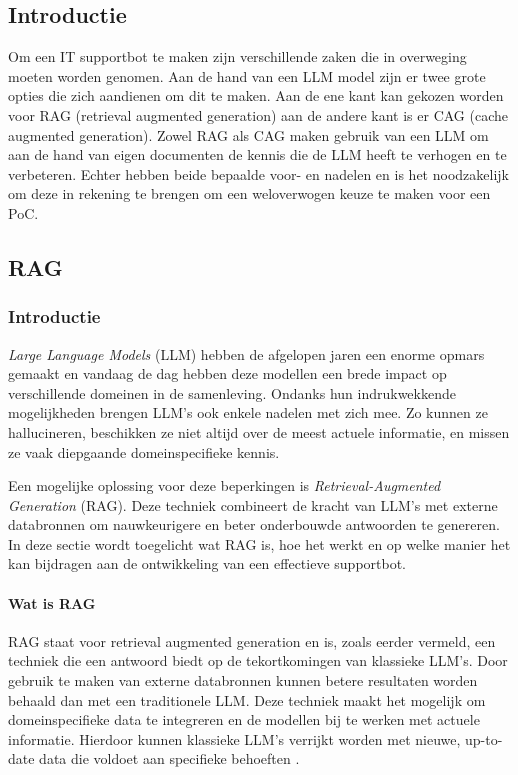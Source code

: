     \subsection{Introductie}
    
    Om een IT supportbot te maken zijn verschillende zaken die in overweging moeten worden genomen. Aan de hand van een LLM model zijn er twee grote opties die zich aandienen om dit te maken. Aan de ene kant kan gekozen worden voor RAG (retrieval augmented generation) aan de andere kant is er CAG (cache augmented generation). Zowel RAG als CAG maken gebruik van een LLM om aan de hand van eigen documenten de kennis die de LLM heeft te verhogen en te verbeteren. Echter hebben beide bepaalde voor- en nadelen en is het noodzakelijk om deze in rekening te brengen om een weloverwogen keuze te maken voor een PoC. 
    
    \subsection{RAG}
    \subsubsection{Introductie}   
    \textit{Large Language Models} (LLM) hebben de afgelopen jaren een enorme opmars gemaakt en vandaag de dag hebben deze modellen een brede impact op verschillende domeinen in de samenleving. Ondanks hun indrukwekkende mogelijkheden brengen LLM’s ook enkele nadelen met zich mee. Zo kunnen ze hallucineren, beschikken ze niet altijd over de meest actuele informatie, en missen ze vaak diepgaande domeinspecifieke kennis.  
    
    Een mogelijke oplossing voor deze beperkingen is \textit{Retrieval-Augmented Generation} (RAG). Deze techniek combineert de kracht van LLM’s met externe databronnen om nauwkeurigere en beter onderbouwde antwoorden te genereren. In deze sectie wordt toegelicht wat RAG is, hoe het werkt en op welke manier het kan bijdragen aan de ontwikkeling van een effectieve supportbot.
    
    \paragraph{Wat is RAG}
    RAG staat voor retrieval augmented generation en is, zoals eerder vermeld, een techniek die een antwoord biedt op de tekortkomingen van klassieke LLM’s. Door gebruik te maken van externe databronnen kunnen betere resultaten worden behaald dan met een traditionele LLM. Deze techniek maakt het mogelijk om domeinspecifieke data te integreren en de modellen bij te werken met actuele informatie. Hierdoor kunnen klassieke LLM’s verrijkt worden met nieuwe, up-to-date data die voldoet aan specifieke behoeften \autocite{Wu2024}.
    
